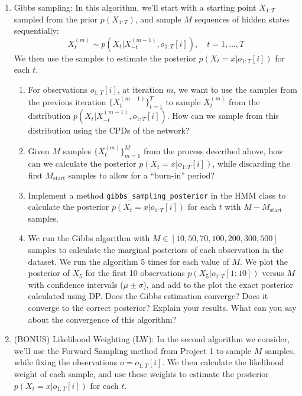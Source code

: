 \documentclass{article}
\begin{document}
\begin{enumerate}
    \item Gibbs sampling: In this algorithm, we’ll start with a starting point $X_{1:T}$ sampled from the prior $p(X_{1:T})$, and sample $M$ sequences of hidden states sequentially:
    \[
    X_t^{(m)} \sim p(X_t | X_{-t}^{(m-1)}, o_{1:T}[i]), \quad t = 1, \ldots, T
    \]
    We then use the samples to estimate the posterior $p(X_t = x | o_{1:T}[i])$ for each $t$.
    
    \begin{enumerate}
        \item For observations $o_{1:T}[i]$, at iteration $m$, we want to use the samples from the previous iteration $\{X_t^{(m-1)}\}_{t=1}^{T}$ to sample $X_t^{(m)}$ from the distribution $p(X_t | X_{-t}^{(m-1)}, o_{1:T}[i])$. How can we sample from this distribution using the CPDs of the network?
        
        \item Given $M$ samples $\{X_t^{(m)}\}_{m=1}^{M}$ from the process described above, how can we calculate the posterior $p(X_t = x | o_{1:T}[i])$, while discarding the first $M_{\text{start}}$ samples to allow for a “burn-in” period?
        
        \item Implement a method \texttt{gibbs\_sampling\_posterior} in the HMM class to calculate the posterior $p(X_t = x | o_{1:T}[i])$ for each $t$ with $M - M_{\text{start}}$ samples.
        
        \item We run the Gibbs algorithm with $M \in [10, 50, 70, 100, 200, 300, 500]$ samples to calculate the marginal posteriors of each observation in the dataset. We run the algorithm 5 times for each value of $M$. We plot the posterior of $X_5$ for the first 10 observations $p(X_5 | o_{1:T}[1 : 10])$ versus $M$ with confidence intervals ($\mu \pm \sigma$), and add to the plot the exact posterior calculated using DP.
        Does the Gibbs estimation converge? Does it converge to the correct posterior? Explain your results. What can you say about the convergence of this algorithm?
    \end{enumerate}
    
    \item (BONUS) Likelihood Weighting (LW): In the second algorithm we consider, we’ll use the Forward Sampling method from Project 1 to sample $M$ samples, while fixing the observations $o = o_{1:T}[i]$. We then calculate the likelihood weight of each sample, and use these weights to estimate the posterior $p(X_t = x | o_{1:T}[i])$ for each $t$.
    

\end{enumerate}
\end{document}
